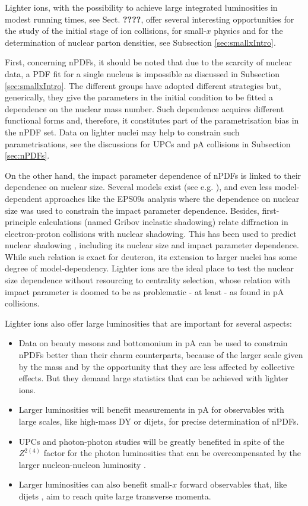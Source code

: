 \documentclass[../report.tex]{subfiles}
\begin{document}
Lighter ions, with the possibility to achieve large integrated luminosities in modest running times, see Sect. {\bf ????}, offer several interesting opportunities for the study of the initial stage of ion collisions, for small-$x$ physics and for the determination of nuclear parton densities, see Subsection \ref{sec:smallxIntro}.

First, concerning nPDFs, it should be noted that due to the scarcity of nuclear data, a PDF fit for a single nucleus is impossible as discussed in Subsection \ref{sec:smallxIntro}. The different groups \cite{deFlorian:2011fp,Kovarik:2015cma,Eskola:2016oht}  have adopted different strategies but, generically, they give the parameters in the initial condition to be fitted a dependence on the nuclear mass number. Such dependence acquires different functional forms and, therefore, it constitutes part of the parametrisation bias in the nPDF set. Data on lighter nuclei may help to constrain such parametrisations, see the discussions for UPCs and pA collisions in Subsection \ref{sec:nPDFs}.

On the other hand, the impact parameter dependence of nPDFs is linked to their dependence on nuclear size. Several models exist (see e.g. \cite{Emelyanov:1998phs,Ferreiro:2008wc}), and even less model-dependent approaches like the EPS09s analysis \cite{Helenius:2012wd} where the dependence on nuclear size was used to constrain the impact parameter dependence. Besides, first-principle calculations (named Gribov inelastic shadowing) relate diffraction in electron-proton collisions with nuclear shadowing. This has been used to predict nuclear shadowing \cite{Frankfurt:2011cs,Armesto:2003fi}, including its nuclear size and impact parameter dependence. While such relation is exact for deuteron, its extension to larger nuclei has some degree of model-dependency. Lighter ions are the ideal place to test the nuclear size dependence without resourcing to centrality selection, whose relation with impact parameter is doomed to be as problematic - at least - as found in pA collisions.

Lighter ions also offer large luminosities that are important for several aspects:
\begin{itemize}
\item Data on beauty mesons and bottomonium in pA can be used to constrain nPDFs \cite{Kusina:2017gkz} better than their charm counterparts, because of the larger scale given by the mass and by the opportunity that they are less affected by collective effects. But they demand large statistics that can be achieved with lighter ions.
\item Larger luminosities will benefit measurements in pA for observables with large scales, like high-mass DY or dijets, for precise determination of nPDFs.
\item UPCs and photon-photon studies \cite{Baltz:2007kq} will be greatly benefited in spite of the $Z^{2(4)}$ factor for the photon luminosities that can be overcompensated by the larger nucleon-nucleon luminosity .
\item Larger luminosities can also benefit small-$x$ forward observables that, like dijets \cite{Dainese:2016gch}, aim to reach quite large transverse momenta.
\end{itemize}
\end{document}
